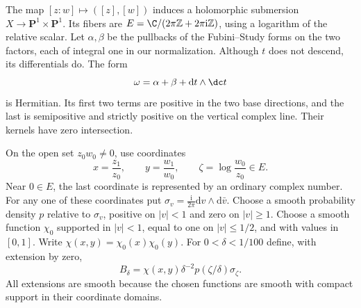 The map $[z:w]\mapsto([z],[w])$ induces a holomorphic submersion
$X\to\mathbf P^1\times\mathbf P^1$. Its fibers are
$E=\C/(2\pi\mathbb Z+2\pi\mathrm{i}\mathbb Z)$, using a logarithm of the relative scalar. Let $\alpha,\beta$ be the pullbacks of the Fubini--Study forms on the two factors, each of integral one in our normalization. Although $t$ does not descend, its differentials do. The form
\begin{equation}\label{eq:lower-mass-quotient-metric}
 \omega=\alpha+\beta+\mathrm{d}t\wedge\dc t
\end{equation}
is Hermitian. Its first two terms are positive in the two base directions, and the last is semipositive and strictly positive on the vertical complex line. Their kernels have zero intersection.

On the open set $z_0w_0\ne0$, use coordinates
\[
 x=\frac{z_1}{z_0},\qquad y=\frac{w_1}{w_0},\qquad
 \zeta=\log\frac{w_0}{z_0}\in E.
\]
Near $0\in E$, the last coordinate is represented by an ordinary complex number. For any one of these coordinates put
$\sigma_v=\frac{\mathrm{i}}{2\pi}\mathrm{d}v\wedge\mathrm{d}\bar v$.
Choose a smooth probability density $p$ relative to $\sigma_v$, positive on $|v|<1$ and zero on $|v|\geq1$. Choose a smooth function $\chi_0$ supported in $|v|<1$, equal to one on $|v|\leq1/2$, and with values in $[0,1]$. Write $\chi(x,y)=\chi_0(x)\chi_0(y)$. For $0<\delta<1/100$ define, with extension by zero,
\[
 B_\delta=\chi(x,y)\delta^{-2}p(\zeta/\delta)\sigma_\zeta.
\]
All extensions are smooth because the chosen functions are smooth with compact support in their coordinate domains.

